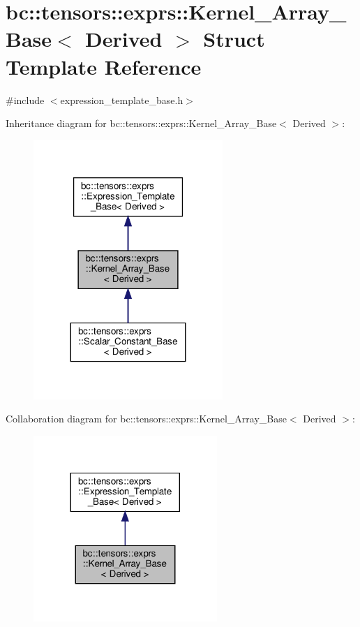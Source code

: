 \hypertarget{structbc_1_1tensors_1_1exprs_1_1Kernel__Array__Base}{}\section{bc\+:\+:tensors\+:\+:exprs\+:\+:Kernel\+\_\+\+Array\+\_\+\+Base$<$ Derived $>$ Struct Template Reference}
\label{structbc_1_1tensors_1_1exprs_1_1Kernel__Array__Base}


{\ttfamily \#include $<$expression\+\_\+template\+\_\+base.\+h$>$}



Inheritance diagram for bc\+:\+:tensors\+:\+:exprs\+:\+:Kernel\+\_\+\+Array\+\_\+\+Base$<$ Derived $>$\+:\nopagebreak
\begin{figure}[H]
\begin{center}
\leavevmode
\includegraphics[width=203pt]{structbc_1_1tensors_1_1exprs_1_1Kernel__Array__Base__inherit__graph}
\end{center}
\end{figure}


Collaboration diagram for bc\+:\+:tensors\+:\+:exprs\+:\+:Kernel\+\_\+\+Array\+\_\+\+Base$<$ Derived $>$\+:\nopagebreak
\begin{figure}[H]
\begin{center}
\leavevmode
\includegraphics[width=197pt]{structbc_1_1tensors_1_1exprs_1_1Kernel__Array__Base__coll__graph}
\end{center}
\end{figure}
